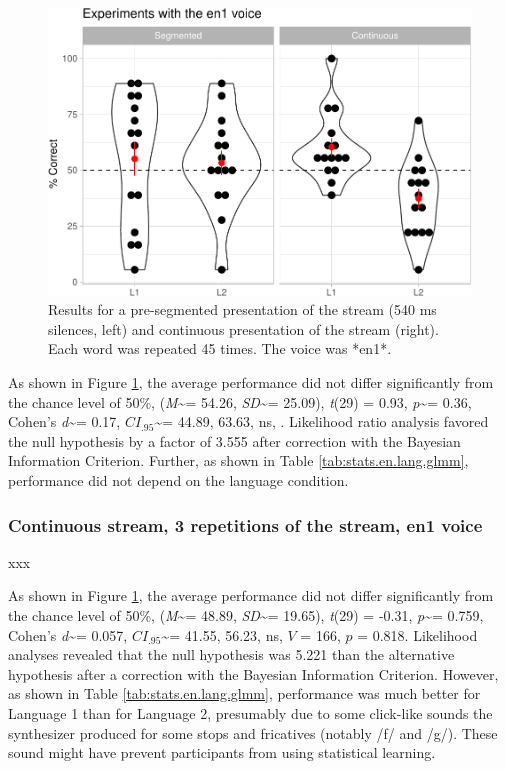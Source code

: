 \documentclass[
]{article}
\newcommand{\T}{{\em t\/}}
\newcommand{\p}{{\em p\/}}
\newcommand{\M}{{\em M\/}}
\newcommand{\SD}{{\em SD\/}}
\newcommand{\D}{Cohen's {\em d\/}}
\newcommand{\CI}{$CI_{.95}$}
\begin{document}
\begin{figure}

{\centering \includegraphics[width=0.8\linewidth]{segmentation_recall_combined_for_revision3_files/figure-latex/stats-london-stats.3x.en.segm-cont.plot-1} 

}

\caption{Results for a pre-segmented presentation of the stream (540 ms silences, left) and continuous presentation of the stream (right). Each word was repeated 45 times. The voice was *en1*.}\label{fig:stats-london-stats.3x.en.segm-cont.plot}
\end{figure}

As shown in Figure \ref{fig:stats-london-stats.3x.en.segm-cont.plot},
the average performance did not differ significantly from the chance
level of 50\%, (\M\textasciitilde= 54.26, \SD\textasciitilde= 25.09),
\T(29) = 0.93, \p\textasciitilde= 0.36, \D\textasciitilde= 0.17,
\CI\textasciitilde= 44.89, 63.63, ns, . Likelihood ratio analysis
favored the null hypothesis by a factor of 3.555 after correction with
the Bayesian Information Criterion. Further, as shown in Table
\ref{tab:stats.en.lang.glmm}, performance did not depend on the language
condition.

\subsubsection{Continuous stream, 3 repetitions of the stream, en1
voice}\label{continuous-stream-3-repetitions-of-the-stream-en1-voice}

xxx

As shown in Figure \ref{fig:stats-london-stats.3x.en.segm-cont.plot},
the average performance did not differ significantly from the chance
level of 50\%, (\M\textasciitilde= 48.89, \SD\textasciitilde= 19.65),
\T(29) = -0.31, \p\textasciitilde= 0.759, \D\textasciitilde= 0.057,
\CI\textasciitilde= 41.55, 56.23, ns, \(V\) = 166, \(p\) = 0.818.
Likelihood analyses revealed that the null hypothesis was 5.221 than the
alternative hypothesis after a correction with the Bayesian Information
Criterion. However, as shown in Table \ref{tab:stats.en.lang.glmm},
performance was much better for Language 1 than for Language 2,
presumably due to some click-like sounds the synthesizer produced for
some stops and fricatives (notably /f/ and /g/). These sound might have
prevent participants from using statistical learning.
\end{document}
